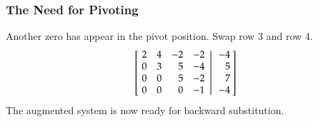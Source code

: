 \documentclass[10pt]{beamer}
\begin{document}
\begin{frame}
\frametitle{The Need for Pivoting}

Another zero has appear in the pivot position.  Swap row 3 and row 4.
\begin{equation*}
    \left[
           \left.\negthickspace\begin{array}{rrrr}  2 &  4 & -2 & -2 \\
                                                    0 &  3 &  5 & -4 \\
                                                    0 &  0 &  5 & -2 \\
                                                    0 &  0 &  0 & -1 \end{array}
           \right|\begin{array}{r} -4 \\  5 \\ 7 \\ -4 \end{array}\negthickspace\right]
\end{equation*}
The augmented system is now ready for backward substitution.

\end{frame}
\end{document}
